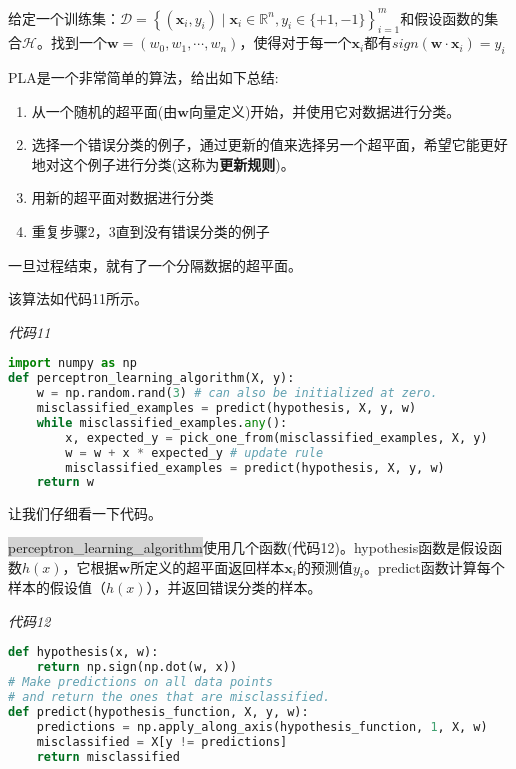 给定一个训练集：$\mathcal{D}=\left\{(\mathbf{x}_i,y_i)\mid \mathbf{x}_i \in \mathbb{R}^n,y_i \in \{+1,-1\}  \right\}_{i=1}^m$和假设函数的集合$\mathcal{H}$。找到一个$\mathbf{w}=(w_0,w_1,\cdots,w_n)$，使得对于每一个$\mathbf{x}_i$都有$sign(\mathbf{w} \cdot \mathbf{x}_i)=y_i$


PLA是一个非常简单的算法，给出如下总结:
\begin{enumerate}
    \item 从一个随机的超平面(由$\mathbf{w}$向量定义)开始，并使用它对数据进行分类。
    \item 选择一个错误分类的例子，通过更新的值来选择另一个超平面，希望它能更好地对这个例子进行分类(这称为\textbf{更新规则})。
    \item 用新的超平面对数据进行分类
    \item 重复步骤2，3直到没有错误分类的例子
\end{enumerate}

一旦过程结束，就有了一个分隔数据的超平面。

该算法如代码11所示。

\emph{代码11}

\begin{lstlisting}[language=python]
import numpy as np 
def perceptron_learning_algorithm(X, y): 
    w = np.random.rand(3) # can also be initialized at zero. 
    misclassified_examples = predict(hypothesis, X, y, w) 
    while misclassified_examples.any(): 
        x, expected_y = pick_one_from(misclassified_examples, X, y) 
        w = w + x * expected_y # update rule 
        misclassified_examples = predict(hypothesis, X, y, w) 
    return w

\end{lstlisting}

让我们仔细看一下代码。

\colorbox{lightgray}{perceptron\_learning\_algorithm}使用几个函数(代码12)。hypothesis函数是假设函数$h(x)$，它根据$\mathbf{w}$所定义的超平面返回样本$\mathbf{x}_i$的预测值$y_i$。predict函数计算每个样本的假设值（$h(x)$），并返回错误分类的样本。

\emph{代码12}

\begin{lstlisting}[language=python]
def hypothesis(x, w): 
    return np.sign(np.dot(w, x)) 
# Make predictions on all data points 
# and return the ones that are misclassified. 
def predict(hypothesis_function, X, y, w): 
    predictions = np.apply_along_axis(hypothesis_function, 1, X, w) 
    misclassified = X[y != predictions] 
    return misclassified
\end{lstlisting}

